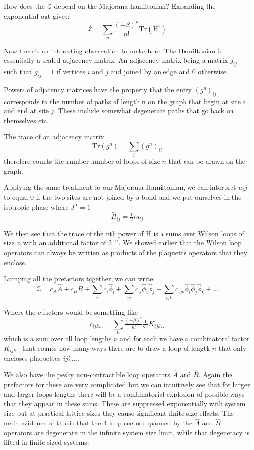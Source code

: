 How does the \(\mathcal{Z}\) depend on the Majorana hamiltonian?
Expanding the exponential out gives:
\[ \mathcal{Z} = \sum_n \frac{(-\beta)^n}{n!} \mathrm{Tr(H^k)} \]

Now there's an interesting observation to make here. The Hamiltonian is
essentially a scaled adjacency matrix. An adjacency matrix being a
matrix \(g_{ij}\) such that \(g_{ij} = 1\) if vertices \(i\) and \(j\)
and joined by an edge and 0 otherwise.

Powers of adjacency matrices have the property that the entry
\((g^n)_{ij}\) corresponds to the number of paths of length n on the
graph that begin at site \(i\) and end at site \(j\). These include
somewhat degenerate paths that go back on themselves etc.

The trace of an adjacency matrix
\[\mathrm{Tr}(g^n) = \sum_i (g^n)_{ii}\] therefore counts the number
number of loops of size \(n\) that can be drawn on the graph.

Applying the same treatment to our Majorana Hamiltonian, we can
interpret \(u_ij\) to equal 0 if the two sites are not joined by a bond
and we put ourselves in the isotropic phase where \(J^\alpha = 1\)
\[ \tilde{H}_{ij} =  \tfrac{1}{2} i u_{ij}\]

We then see that the trace of the nth power of H is a sums over Wilson
loops of size \(n\) with an additional factor of \(2^{-n}\). We showed
earlier that the Wilson loop operators can always be written as products
of the plaquette operators that they enclose.

Lumping all the prefactors together, we can write:
\[ \mathcal{Z} = c_A \hat{A} + c_B \hat{B} + \sum_i c_i \hat{\phi}_i + \sum_{ij} c_{ij}  \hat{\phi}_i \hat{\phi}_j + \sum_{ijk} c_{ijk}  \hat{\phi}_i \hat{\phi}_j \hat{\phi}_k + ...\]

Where the \(c\) factors would be something like
\[c_{ijk...} = \sum_n \tfrac{(-\beta)^n}{n!} \tfrac{1}{2^n} K_{ijk...}\]
which is a sum over all loop lengths \(n\) and for each we have a
combinatoral factor \(K_{ijk...}\) that counts how many ways there are
to draw a loop of length \(n\) that only encloses plaquettes \(ijk...\).

We also have the pesky non-contractible loop operators \(\hat{A}\) and
\(\hat{B}\). Again the prefactors for these are very complicated but we
can intuitively see that for larger and larger loops lengths there will
be a combinatorial explosion of possible ways that they appear in these
sums. These are suppressed exponentially with system size but at
practical lattice sizes they cause significant finite size effects. The
main evidence of this is that the 4 loop sectors spanned by the
\(\hat{A}\) and \(\hat{B}\) operators are degenerate in the infinite
system size limit, while that degeneracy is lifted in finite sized
systems.

